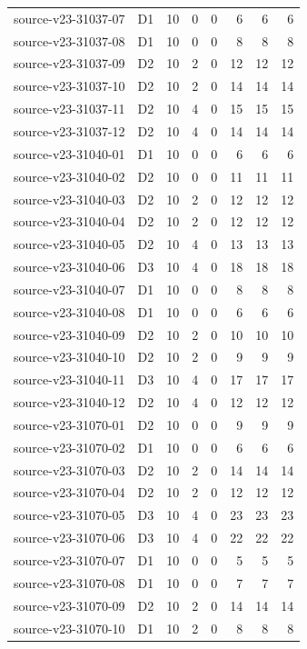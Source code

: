 \begin{longtable}{p{}lrrrrrr}
source-v23-31037-07 & D1 & 10 & 0 & 0 & 6 & 6 & 6\\
source-v23-31037-08 & D1 & 10 & 0 & 0 & 8 & 8 & 8\\
source-v23-31037-09 & D2 & 10 & 2 & 0 & 12 & 12 & 12\\
source-v23-31037-10 & D2 & 10 & 2 & 0 & 14 & 14 & 14\\
source-v23-31037-11 & D2 & 10 & 4 & 0 & 15 & 15 & 15\\
source-v23-31037-12 & D2 & 10 & 4 & 0 & 14 & 14 & 14\\
source-v23-31040-01 & D1 & 10 & 0 & 0 & 6 & 6 & 6\\
source-v23-31040-02 & D2 & 10 & 0 & 0 & 11 & 11 & 11\\
source-v23-31040-03 & D2 & 10 & 2 & 0 & 12 & 12 & 12\\
source-v23-31040-04 & D2 & 10 & 2 & 0 & 12 & 12 & 12\\
source-v23-31040-05 & D2 & 10 & 4 & 0 & 13 & 13 & 13\\
source-v23-31040-06 & D3 & 10 & 4 & 0 & 18 & 18 & 18\\
source-v23-31040-07 & D1 & 10 & 0 & 0 & 8 & 8 & 8\\
source-v23-31040-08 & D1 & 10 & 0 & 0 & 6 & 6 & 6\\
source-v23-31040-09 & D2 & 10 & 2 & 0 & 10 & 10 & 10\\
source-v23-31040-10 & D2 & 10 & 2 & 0 & 9 & 9 & 9\\
source-v23-31040-11 & D3 & 10 & 4 & 0 & 17 & 17 & 17\\
source-v23-31040-12 & D2 & 10 & 4 & 0 & 12 & 12 & 12\\
source-v23-31070-01 & D2 & 10 & 0 & 0 & 9 & 9 & 9\\
source-v23-31070-02 & D1 & 10 & 0 & 0 & 6 & 6 & 6\\
source-v23-31070-03 & D2 & 10 & 2 & 0 & 14 & 14 & 14\\
source-v23-31070-04 & D2 & 10 & 2 & 0 & 12 & 12 & 12\\
source-v23-31070-05 & D3 & 10 & 4 & 0 & 23 & 23 & 23\\
source-v23-31070-06 & D3 & 10 & 4 & 0 & 22 & 22 & 22\\
source-v23-31070-07 & D1 & 10 & 0 & 0 & 5 & 5 & 5\\
source-v23-31070-08 & D1 & 10 & 0 & 0 & 7 & 7 & 7\\
source-v23-31070-09 & D2 & 10 & 2 & 0 & 14 & 14 & 14\\
source-v23-31070-10 & D1 & 10 & 2 & 0 & 8 & 8 & 8\\

\end{longtable}
